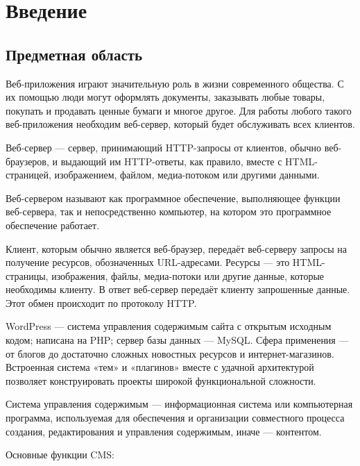 \documentclass[20pt]{article}
\begin{document}
\newpage

\tableofcontents

\newpage

\section{Введение}

\subsection{Предметная область}

Веб-приложения играют значительную роль в жизни современного общества. С их
помощью люди могут оформлять документы, заказывать любые товары, покупать и
продавать ценные бумаги и многое другое. Для работы любого такого веб-приложения
необходим веб-сервер, который будет обслуживать всех клиентов.

Веб-сервер\cite{wiki/web-server} — сервер, принимающий HTTP-запросы от клиентов,
обычно веб-браузеров, и выдающий им HTTP-ответы, как правило, вместе с
HTML-страницей, изображением, файлом, медиа-потоком или другими данными.

Веб-сервером называют как программное обеспечение, выполняющее функции веб-сервера,
так и непосредственно компьютер, на котором это программное обеспечение работает.

Клиент, которым обычно является веб-браузер, передаёт веб-серверу запросы на
получение ресурсов, обозначенных URL-адресами. Ресурсы — это HTML-страницы,
изображения, файлы, медиа-потоки или другие данные, которые необходимы клиенту.
В ответ веб-сервер передаёт клиенту запрошенные данные. Этот обмен происходит
по протоколу HTTP.

WordPress\cite{wiki/wordpress} — система управления содержимым сайта с
открытым исходным кодом; написана на PHP; сервер базы данных — MySQL.
Сфера применения — от блогов до достаточно сложных новостных ресурсов и
интернет-магазинов. Встроенная система «тем» и «плагинов» вместе с удачной
архитектурой позволяет конструировать проекты широкой функциональной сложности.

Система управления содержимым\cite{wiki/cms} — информационная система или
компьютерная программа, используемая для обеспечения и организации совместного
процесса создания, редактирования и управления содержимым, иначе — контентом.

Основные функции CMS:
\end{document}
